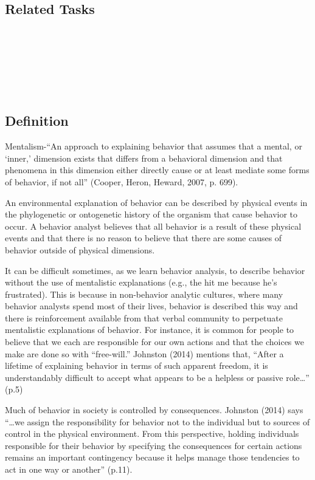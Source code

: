 \subsection{Related Tasks}
\fourbOne{}\\
\fourgFour{}\\
\fourgSix{}\\
\fourkEight{}\\
\fourkNine{}\\
%
%
%
%
%
%
%
\section[\fourFKSeven{}]{\fourFKSeven{}%
              }
\subsection{Definition}
Mentalism-``An approach to explaining behavior that assumes that a mental, or ‘inner,' dimension exists that differs from a behavioral dimension and that phenomena in this dimension either directly cause or at least mediate some forms of behavior, if not all'' (Cooper, Heron, Heward, 2007, p. 699).

An environmental explanation of behavior can be described by physical events in the phylogenetic or ontogenetic history of the organism that cause behavior to occur. A behavior analyst believes that all behavior is a result of these physical events and that there is no reason to believe that there are some causes of behavior outside of physical dimensions.

It can be difficult sometimes, as we learn behavior analysis, to describe behavior without the use of mentalistic explanations (e.g., the hit me because he's frustrated). This is because in non-behavior analytic cultures, where many behavior analysts spend most of their lives, behavior is described this way and there is reinforcement available from that verbal community to perpetuate mentalistic explanations of behavior. For instance, it is common for people to believe that we each are responsible for our own actions and that the choices we make are done so with ``free-will.''  Johnston (2014) mentions that, ``After a lifetime of explaining behavior in terms of such apparent freedom, it is understandably difficult to accept what appears to be a helpless or passive role…'' (p.5) 

Much of behavior in society is controlled by consequences. Johnston (2014) says ``…we assign the responsibility for behavior not to the individual but to sources of control in the physical environment. From this perspective, holding individuals responsible for their behavior by specifying the consequences for certain actions remains an important contingency because it helps manage those tendencies to act in one way or another'' (p.11).
%
%
%
%
